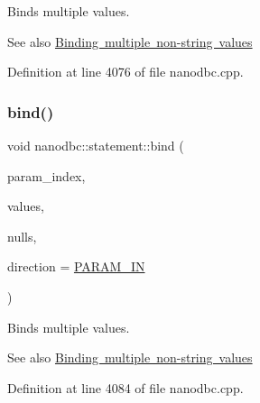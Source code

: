 Binds multiple values. 

\begin{DoxySeeAlso}{See also}
\mbox{\hyperlink{group__bind__multi}{Binding multiple non-\/string values}} 
\end{DoxySeeAlso}


Definition at line 4076 of file nanodbc.\+cpp.

\mbox{\label{group__bind__multi_ga5242c1154450bfe699b73a2f26294560}} 
\subsubsection{\texorpdfstring{bind()}{bind()}\hspace{0.1cm}{\footnotesize\ttfamily [5/6]}}
{\footnotesize\ttfamily void nanodbc\+::statement\+::bind (\begin{DoxyParamCaption}\item[{short}]{param\+\_\+index,  }\item[{std\+::vector$<$ std\+::vector$<$ uint8\+\_\+t $>$$>$ const \&}]{values,  }\item[{bool const $\ast$}]{nulls,  }\item[{\mbox{\hyperlink{classnanodbc_1_1statement_a523142f53cbbee8d68a074da993e7fa6}{param\+\_\+direction}}}]{direction = {\ttfamily \mbox{\hyperlink{classnanodbc_1_1statement_a523142f53cbbee8d68a074da993e7fa6ae33f42ce0677d00c291ff4d8e39f99de}{P\+A\+R\+A\+M\+\_\+\+IN}}} }\end{DoxyParamCaption})}



Binds multiple values. 

\begin{DoxySeeAlso}{See also}
\mbox{\hyperlink{group__bind__multi}{Binding multiple non-\/string values}} 
\end{DoxySeeAlso}


Definition at line 4084 of file nanodbc.\+cpp.

\mbox{\label{group__bind__multi_ga72e3b3fea37e2e8456f4cf2b66aa21f2}} 
